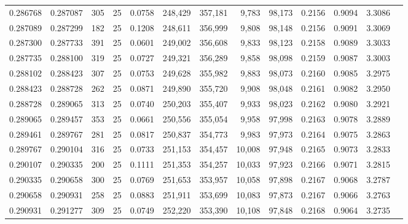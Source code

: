 \begin{tabular}{rrrrrrrrrrrrr}
0.286768 & 0.287087 &   305 &  25 &                                     0.0758 & 248,429 & 357,181 &   9,783 &  98,173 & 0.2156 & 0.9094 & 3.3086 \\
0.287089 & 0.287299 &   182 &  25 &                                     0.1208 & 248,611 & 356,999 &   9,808 &  98,148 & 0.2156 & 0.9091 & 3.3069 \\
0.287300 & 0.287733 &   391 &  25 &                                     0.0601 & 249,002 & 356,608 &   9,833 &  98,123 & 0.2158 & 0.9089 & 3.3033 \\
0.287735 & 0.288100 &   319 &  25 &                                     0.0727 & 249,321 & 356,289 &   9,858 &  98,098 & 0.2159 & 0.9087 & 3.3003 \\
0.288102 & 0.288423 &   307 &  25 &                                     0.0753 & 249,628 & 355,982 &   9,883 &  98,073 & 0.2160 & 0.9085 & 3.2975 \\
0.288423 & 0.288728 &   262 &  25 &                                     0.0871 & 249,890 & 355,720 &   9,908 &  98,048 & 0.2161 & 0.9082 & 3.2950 \\
0.288728 & 0.289065 &   313 &  25 &                                     0.0740 & 250,203 & 355,407 &   9,933 &  98,023 & 0.2162 & 0.9080 & 3.2921 \\
0.289065 & 0.289457 &   353 &  25 &                                     0.0661 & 250,556 & 355,054 &   9,958 &  97,998 & 0.2163 & 0.9078 & 3.2889 \\
0.289461 & 0.289767 &   281 &  25 &                                     0.0817 & 250,837 & 354,773 &   9,983 &  97,973 & 0.2164 & 0.9075 & 3.2863 \\
0.289767 & 0.290104 &   316 &  25 &                                     0.0733 & 251,153 & 354,457 &  10,008 &  97,948 & 0.2165 & 0.9073 & 3.2833 \\
0.290107 & 0.290335 &   200 &  25 &                                     0.1111 & 251,353 & 354,257 &  10,033 &  97,923 & 0.2166 & 0.9071 & 3.2815 \\
0.290335 & 0.290658 &   300 &  25 &                                     0.0769 & 251,653 & 353,957 &  10,058 &  97,898 & 0.2167 & 0.9068 & 3.2787 \\
0.290658 & 0.290931 &   258 &  25 &                                     0.0883 & 251,911 & 353,699 &  10,083 &  97,873 & 0.2167 & 0.9066 & 3.2763 \\
0.290931 & 0.291277 &   309 &  25 &                                     0.0749 & 252,220 & 353,390 &  10,108 &  97,848 & 0.2168 & 0.9064 & 3.2735 \\

\end{tabular}

